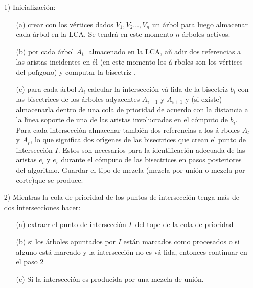 \documentclass[12pt,english]{report}
\begin{document}
\begin{itemize}
\item[1)] Inicializaci\'{o}n:

\begin{itemize}
\item[(a)] crear con los v\'{e}rtices dados $V_{1},V_{2}\ldots ,V_{n}$ un 
\'{a}rbol para luego almacenar cada \'{a}rbol en la LCA. Se tendr\'a en este
momento $n$ \'{a}rboles activos.\qquad 

\item[(b)] por cada \'{a}rbol $A_{i\text{,}}$\ almacenado en la LCA, a\~{n}%
adir dos referencias a las aristas incidentes en \'el (en este momento los \'{a}%
rboles son los v\'ertices del pol\'{\i}gono) y computar la bisectriz .

\item[(c)] para cada \'{a}rbol$\ A_{i}$ calcular la intersecci\'{o}n v\'{a}%
lida de la bisectriz $b_i$ con las bisectrices de los \'{a}rboles adyacentes $%
A_{i-1}$ y $A_{i+1}$ y (si existe) almacenarla dentro de una cola de
prioridad de acuerdo con la distancia a la l\'{\i}nea soporte de una de las aristas involucradas en el c\'omputo de $b_i$.
Para cada intersecci\'{o}n almacenar tambi\'{e}n dos referencias a los \'{a}%
rboles $A_{l}$ y $A_{r}$, lo que significa dos or\'{\i}genes de las
bisectrices que crean el punto de intersecci\'{o}n $I$. Estos son necesarios
para la identificaci\'{o}n adecuada de las aristas $e_{l}$ y $e_{r}$ durante
el c\'{o}mputo de las bisectrices en pasos posteriores del algoritmo.
Guardar el tipo de mezcla (mezcla por uni\'{o}n o mezcla por corte)que se produce. \qquad 
\end{itemize}

\item[2)] Mientras la cola de prioridad de los puntos de intersecci\'{o}n
tenga m\'{a}s de dos intersecciones hacer:

\begin{itemize}
\item[(a)] extraer el punto de intersecci\'{o}n $I$\ del tope de la cola de
prioridad

\item[(b)] si los \'{a}rboles apuntados por $I$ est\'{a}n marcados como
procesados o si alguno est\'{a} marcado y la intersecci\'{o}n no es v\'{a}%
lida, entonces continuar en el paso 2 \qquad 

\item[(c)] Si la intersecci\'{o}n es producida por una mezcla de uni\'{o}n.


\end{itemize}
\end{itemize}
\end{document}
